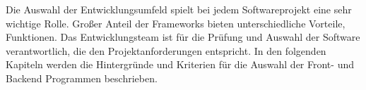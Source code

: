
\begin{spacing}{1}
    
\end{spacing}
Die Auswahl der Entwicklungsumfeld spielt bei jedem Softwareprojekt eine sehr
wichtige Rolle. Großer Anteil der Frameworks bieten unterschiedliche Vorteile,
Funktionen. 
Das Entwicklungsteam ist für die Prüfung und Auswahl der Software verantwortlich,
die den Projektanforderungen entspricht. In den folgenden Kapiteln werden
die Hintergründe und Kriterien für die Auswahl der Front- und Backend Programmen
beschrieben. 